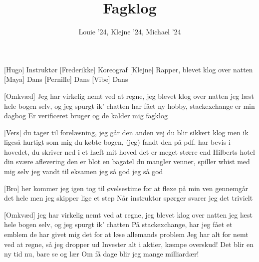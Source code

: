\documentclass[a4paper,11pt]{article}
\title{Fagklog}
\author{Louie '24, Klejne '24, Michael '24}
\begin{document}
\maketitle

\begin{roles}
[Hugo] Instruktør
[Frederikke] Koreograf
[Klejne] Rapper, blevet klog over natten
[Maya] Dans
[Pernille] Dans
[Vibe] Dans
\end{roles}

\begin{song}
[Omkvæd] 
  Jeg har virkelig nemt ved at regne, jeg blevet klog over natten
  jeg læst hele bogen selv, og jeg spurgt ik' chatten
  har fået ny hobby, stackexchange er min dagbog
  Er verificeret bruger og de kalder mig fagklog

  [Vers] du tager til forelæsning, jeg går den anden vej
  du blir sikkert klog men ik ligeså hurtigt som mig
  du købte bogen, (jeg) fandt den på pdf.
  har bevis i hovedet, du skriver ned i et hæft
  mit hoved det er meget større end Hilberts hotel
  din svære aflevering den er blot en bagatel
  du mangler venner, spiller whist med mig selv
  jeg vandt til eksamen jeg så god jeg så god

  [Bro] her kommer jeg igen
  tog til øvelsestime for at flexe på min ven
  gennemgår det hele men jeg skipper lige et step
  Når instruktor spørger svarer jeg det trivielt

  [Omkvæd] 
  jeg har virkelig nemt ved at regne, jeg blevet klog over natten
  jeg læst hele bogen selv, og jeg spurgt ik' chatten
  På stackexchange, har jeg fået et emblem
  de har givet mig det for at løse allemands problem
  Jeg har alt for nemt ved at regne, så jeg dropper ud
Invester alt i aktier, kæmpe overskud!
Det blir en ny tid nu, bare se og lær
Om få dage blir jeg mange milliardær!
\end{song}
\end{document}
